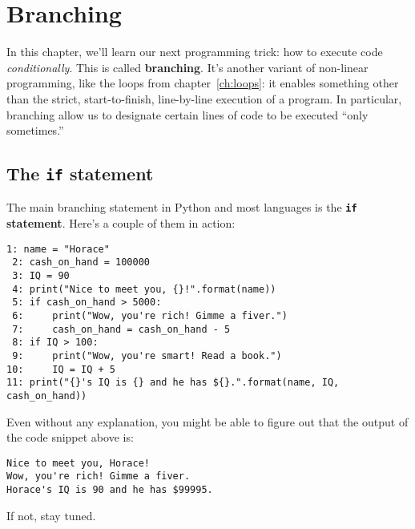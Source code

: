 
\chapter{Branching}
\label{ch:branching}


In this chapter, we'll learn our next programming trick: how to execute code
\textit{conditionally}. This is called \textbf{branching}. It's another variant
of non-linear programming, like the loops from chapter~\ref{ch:loops}: it
enables something other than the strict, start-to-finish, line-by-line
execution of a program. In particular, branching allow us to designate certain
lines of code to be executed ``only sometimes.''

\section{The \texttt{if} statement}


The main branching statement in Python and most languages is the
\textbf{\texttt{if} statement}. Here's a couple of them in action:


\begin{Verbatim}[fontsize=\small,samepage=true,frame=single,framesep=3mm]
 1: name = "Horace"
 2: cash_on_hand = 100000
 3: IQ = 90
 4: print("Nice to meet you, {}!".format(name))
 5: if cash_on_hand > 5000:
 6:     print("Wow, you're rich! Gimme a fiver.")
 7:     cash_on_hand = cash_on_hand - 5
 8: if IQ > 100:
 9:     print("Wow, you're smart! Read a book.")
10:     IQ = IQ + 5
11: print("{}'s IQ is {} and he has ${}.".format(name, IQ, cash_on_hand))
\end{Verbatim}
\vspace{-.2in}

Even without any explanation, you might be able to figure out that the output
of the code snippet above is:

\begin{Verbatim}[fontsize=\small,samepage=true,frame=leftline,framesep=5mm,framerule=1mm]
Nice to meet you, Horace!
Wow, you're rich! Gimme a fiver.
Horace's IQ is 90 and he has $99995.
\end{Verbatim}

If not, stay tuned.


